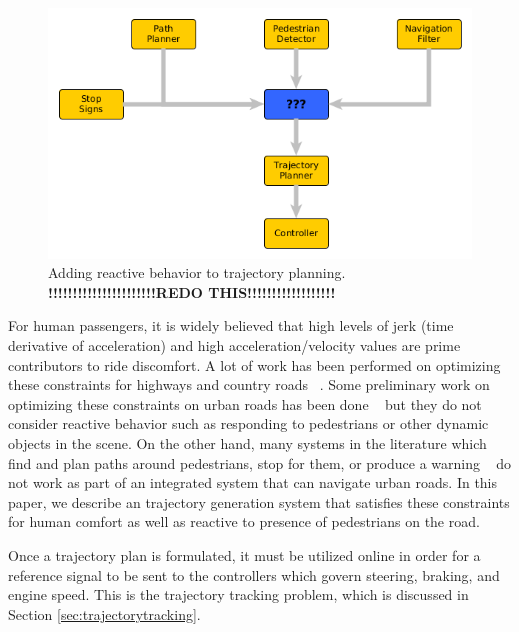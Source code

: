 \documentclass[letterpaper, 10 pt, conference]{ieeeconf}  %
\begin{document}
\begin{figure}[thpb]
  \centering
  \includegraphics[width=1.0\columnwidth]{graphics/MissingReactionPiece2.png}
  \caption{
    Adding reactive behavior to trajectory planning.
    \newline
    \textbf{!!!!!!!!!!!!!!!!!!!!!!REDO THIS!!!!!!!!!!!!!!!!!!}
  }
  \label{fig:addreact}
\end{figure}

For human passengers, it is widely believed that high levels of jerk (time derivative of acceleration) and high acceleration/velocity values are prime contributors to ride discomfort.
A lot of work has been performed on optimizing these constraints for highways and country roads ~\cite{ziegler14,bahram15,xu12,CHEB15CI}.
Some preliminary work on optimizing these constraints on urban roads has been done ~\cite{Rastelli14,Li15} but they do not consider reactive behavior such as responding to pedestrians or other dynamic objects in the scene.
On the other hand, many systems in the literature which find and plan paths around pedestrians, stop for them, or produce a warning ~\cite{pradalier05,benenson06,gu14,mogelmose15,johnson13} do not work as part of an integrated system that can navigate urban roads.
In this paper, we describe an trajectory generation system that satisfies these constraints for human comfort as well as reactive to presence of pedestrians on the road.

Once a trajectory plan is formulated, it must be utilized online in order for a reference signal to be sent to the controllers which govern steering, braking, and engine speed.
This is the trajectory tracking problem, which is discussed in Section \ref{sec:trajectorytracking}.

\end{document}
